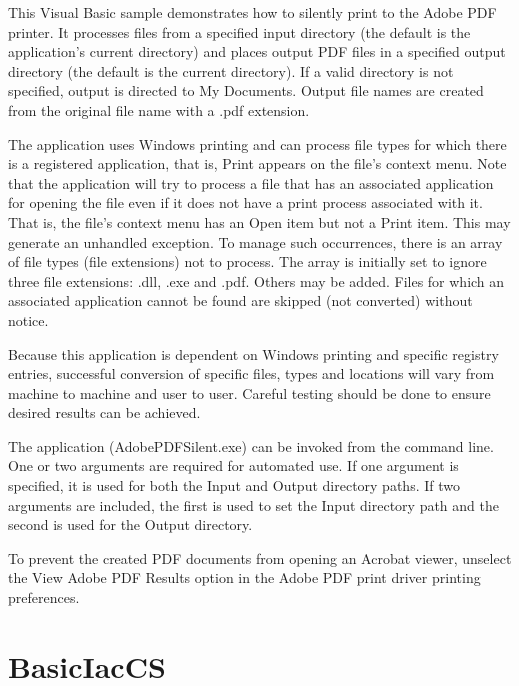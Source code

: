 \documentclass[letterpaper,12pt,english,openany,oneside]{sphinxmanual}
\begin{document}
This Visual Basic sample demonstrates how to silently print to the Adobe PDF printer. It processes files from a specified input directory (the default is the application’s current directory) and places output PDF files in a specified output directory (the default is the current directory). If a valid directory is not specified, output is directed to My Documents. Output file names are created from the original file name with a .pdf extension.

The application uses Windows printing and can process file types for which there is a registered application, that is, Print appears on the file’s context menu. Note that the application will try to process a file that has an associated application for opening the file even if it does not have a print process associated with it. That is, the file’s context menu has an Open item but not a Print item. This may generate an unhandled exception. To manage such occurrences, there is an array of file types (file extensions) not to process. The array is initially set to ignore three file extensions: .dll, .exe and .pdf. Others may be added. Files for which an associated application cannot be found are skipped (not converted) without notice.

Because this application is dependent on Windows printing and specific registry entries, successful conversion of specific files, types and locations will vary from machine to machine and user to user. Careful testing should be done to ensure desired results can be achieved.

\label{\detokenize{Samples_WindowsIAC:usage-4}}

The application (AdobePDFSilent.exe) can be invoked from the command line. One or two arguments are required for automated use. If one argument is specified, it is used for both the Input and Output directory paths. If two arguments are included, the first is used to set the Input directory path and the second is used for the Output directory.

To prevent the created PDF documents from opening an Acrobat viewer, unselect the View Adobe PDF Results option in the Adobe PDF print driver printing preferences.


\section{BasicIacCS}
\label{\detokenize{Samples_WindowsIAC:basiciaccs}}\label{\detokenize{Samples_WindowsIAC:location-5}}
\end{document}

